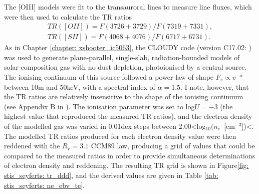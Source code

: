 \newpage
The [OIII] models were fit to the transauroral lines to measure line fluxes, which were then used to calculate the TR ratios
\begin{align*}
TR([OII]) = F(3726 + 3729) / F(7319 + 7331), \\
TR([SII]) = F(4068 + 4076) / F(6717 + 6731).
\end{align*} 
As in Chapter \ref{chapter: xshooter_ic5063}, the \textsc{CLOUDY} code (version C17.02: \citealt{Ferland2017}) was used to generate plane-parallel, single-slab, radiation-bounded models of solar-composition gas with no dust depletion, photoionised by a central source. The ionising continuum of this source followed a power-law of shape $F_v \propto v^{-\alpha}$ between 10\;{\textmu}m and 50\;keV, with a spectral index of $\alpha=1.5$. I note, however, that the TR ratios are relatively insensitive to the shape of the ionising continuum (see Appendix B in \citealt{Santoro2020}). The ionisation parameter was set to log\;$U=-3$ (the highest value that reproduced the measured TR ratios), and the electron density of the modelled gas was varied in 0.01\;dex steps between \mbox{2.00\;\textless\;log$_{10}(n_e$ [cm$^{-3}$])\;\textless{}}. The modelled TR ratios produced for each electron density value were then reddened with the $R_\mathrm{v}=3.1$ CCM89 law, producing a grid of values that could be compared to the measured ratios in order to provide simultaneous determinations of electron density and reddening. The resulting TR grid is shown in Figure\;\ref{fig: stis_seyferts: tr_ddd}, and the derived values are given in Table {\ref{tab: stis_seyferts: ne_ebv_te}}.

